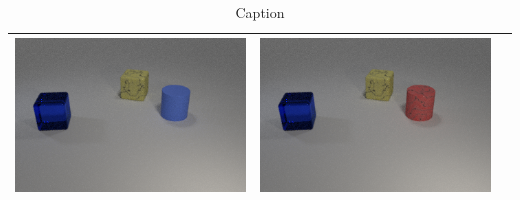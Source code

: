 \begin{table}
\begin{tabular}{@{}ccc@{}}
\begin{minipage}{.3\textwidth}
      \includegraphics[width=\linewidth]{figures/clevr_datasets/SCLEVR3_negcolor.png}
    \end{minipage}
    &
    \begin{minipage}{.3\textwidth}
      \includegraphics[width=\linewidth]{figures/clevr_datasets/SCLEVR3_negmat.png}
    \end{minipage}
\\
\bottomrule
\end{tabular}
\caption{Caption}
\end{table}

